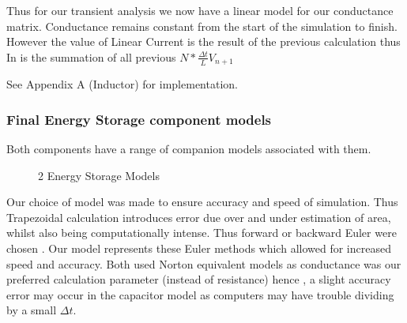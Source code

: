 \documentclass{article}
\begin{document}
\bigbreak

Thus for our transient analysis we now have a linear model for our conductance matrix. Conductance remains constant from the start of the simulation to finish. However the value of Linear Current is the result of the previous calculation thus In is the summation of all previous $ N * \frac{\Delta t}{L}V_{n+1}$

\bigbreak

See Appendix A (Inductor) for implementation.

\newpage

\subsubsection{Final Energy Storage component models}
Both components have a range of companion models associated with them. 

\begin{figure}[h]%
    \centering
    \qquad
    \caption{2 Energy Storage Models}%
    \label{fig:example}%
\end{figure}

Our choice of model was made to ensure accuracy and speed of simulation. Thus Trapezoidal calculation introduces error due over and under estimation of area, whilst also being computationally intense. Thus forward or backward Euler were chosen . Our model represents these Euler methods which allowed for increased speed and accuracy. Both used Norton equivalent models as conductance was our preferred calculation parameter (instead of resistance) hence , a slight accuracy error may occur in the capacitor model as computers may have trouble dividing by a small $\Delta t$.
\end{document}
